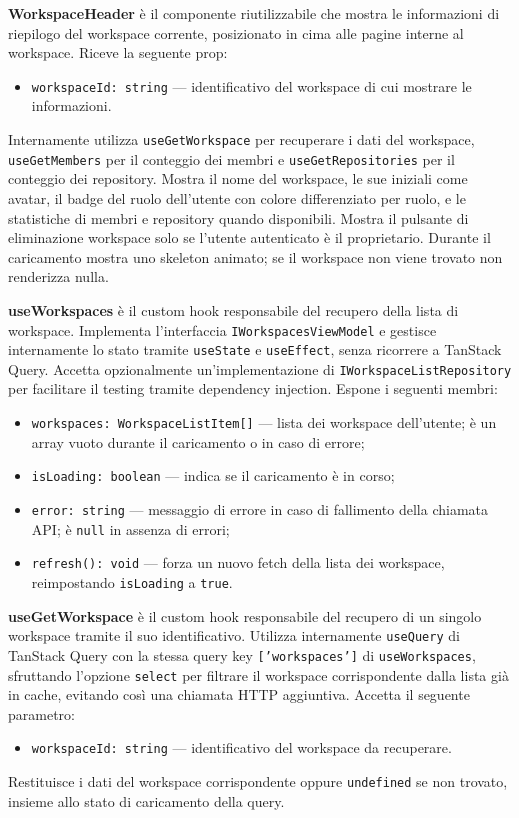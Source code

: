 \documentclass[a4paper, 11pt]{article}
\newcounter{subsubsubsection}[subsubsection]
\newcounter{subsubsubsubsection}[subsubsubsection]
\begin{document}
\textbf{WorkspaceHeader} è il componente riutilizzabile che mostra le informazioni di riepilogo
del workspace corrente, posizionato in cima alle pagine interne al workspace. Riceve la seguente
prop:
\begin{itemize}
  \item \texttt{workspaceId: string} — identificativo del workspace di cui mostrare le
        informazioni.
\end{itemize}
Internamente utilizza \texttt{useGetWorkspace} per recuperare i dati del workspace,
\texttt{useGetMembers} per il conteggio dei membri e \texttt{useGetRepositories} per il
conteggio dei repository. Mostra il nome del workspace, le sue iniziali come avatar, il badge
del ruolo dell'utente con colore differenziato per ruolo, e le statistiche di membri e
repository quando disponibili. Mostra il pulsante di eliminazione workspace solo se l'utente
autenticato è il proprietario. Durante il caricamento mostra uno skeleton animato; se il
workspace non viene trovato non renderizza nulla.


\textbf{useWorkspaces} è il custom hook responsabile del recupero della lista di workspace.
Implementa l'interfaccia \texttt{IWorkspacesViewModel} e gestisce internamente lo stato tramite
\texttt{useState} e \texttt{useEffect}, senza ricorrere a TanStack Query. Accetta opzionalmente
un'implementazione di \texttt{IWorkspaceListRepository} per facilitare il testing tramite
dependency injection. Espone i seguenti membri:
\begin{itemize}
  \item \texttt{workspaces: WorkspaceListItem[]} — lista dei workspace dell'utente; è un array
        vuoto durante il caricamento o in caso di errore;
  \item \texttt{isLoading: boolean} — indica se il caricamento è in corso;
  \item \texttt{error: string} — messaggio di errore in caso di fallimento della chiamata API;
        è \texttt{null} in assenza di errori;
  \item \texttt{refresh(): void} — forza un nuovo fetch della lista dei workspace, reimpostando
        \texttt{isLoading} a \texttt{true}.
\end{itemize}

\textbf{useGetWorkspace} è il custom hook responsabile del recupero di un singolo workspace
tramite il suo identificativo. Utilizza internamente \texttt{useQuery} di TanStack Query con
la stessa query key \texttt{['workspaces']} di \texttt{useWorkspaces}, sfruttando l'opzione
\texttt{select} per filtrare il workspace corrispondente dalla lista già in cache, evitando
così una chiamata HTTP aggiuntiva. Accetta il seguente parametro:
\begin{itemize}
  \item \texttt{workspaceId: string} — identificativo del workspace da recuperare.
\end{itemize}
Restituisce i dati del workspace corrispondente oppure \texttt{undefined} se non trovato, insieme
allo stato di caricamento della query.
\end{document}
